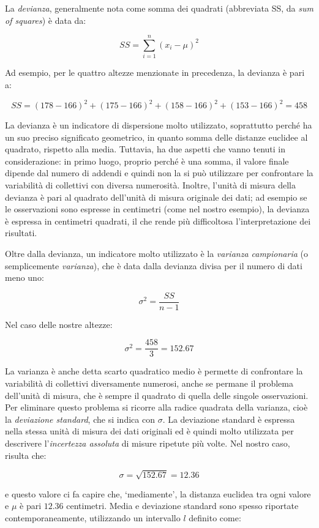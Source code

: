 \documentclass[a4paper,12pt,oneside]{book}
\begin{document}
La \emph{devianza}, generalmente nota come somma dei quadrati (abbreviata SS, da \emph{sum of squares}) è data da:

\[SS = \sum\limits_{i = 1}^n {(x_i  - \mu)^2 }\]

Ad esempio, per le quattro altezze menzionate in precedenza, la devianza è pari a:

\[SS = \left(178 - 166 \right)^2 + \left(175 - 166 \right)^2 + \left(158 - 166 \right)^2  + \left(153 - 166 \right)^2 = 458\]

La devianza è un indicatore di dispersione molto utilizzato, soprattutto perché ha un suo preciso significato geometrico, in quanto somma delle distanze euclidee al quadrato, rispetto alla media. Tuttavia, ha due aspetti che vanno tenuti in considerazione: in primo luogo, proprio perché è una somma, il valore finale dipende dal numero di addendi e quindi non la si può utilizzare per confrontare la variabilità di collettivi con diversa numerosità. Inoltre, l'unità di misura della devianza è pari al quadrato dell'unità di misura originale dei dati; ad esempio se le osservazioni sono espresse in centimetri (come nel nostro esempio), la devianza è espressa in centimetri quadrati, il che rende più difficoltosa l'interpretazione dei risultati.

Oltre dalla devianza, un indicatore molto utilizzato è la \emph{varianza campionaria} (o semplicemente \emph{varianza}), che è data dalla devianza divisa per il numero di dati meno uno:

\[\sigma^2  = \frac{SS}{n - 1}\]

Nel caso delle nostre altezze:

\[\sigma^2  = \frac{458}{3} = 152.67\]

La varianza è anche detta scarto quadratico medio è permette di confrontare la variabilità di collettivi diversamente numerosi, anche se permane il problema dell'unità di misura, che è sempre il quadrato di quella delle singole osservazioni. Per eliminare questo problema si ricorre alla radice quadrata della varianza, cioè la \emph{deviazione standard}, che si indica con \(\sigma\). La deviazione standard è espressa nella stessa unità di misura dei dati originali ed è quindi molto utilizzata per descrivere l'\emph{incertezza assoluta} di misure ripetute più volte. Nel nostro caso, risulta che:

\[\sigma  = \sqrt{152.67} = 12.36\]

e questo valore ci fa capire che, `mediamente', la distanza euclidea tra ogni valore e \(\mu\) è pari \(12.36\) centimetri. Media e deviazione standard sono spesso riportate contemporaneamente, utilizzando un intervallo \(l\) definito come:
\end{document}
